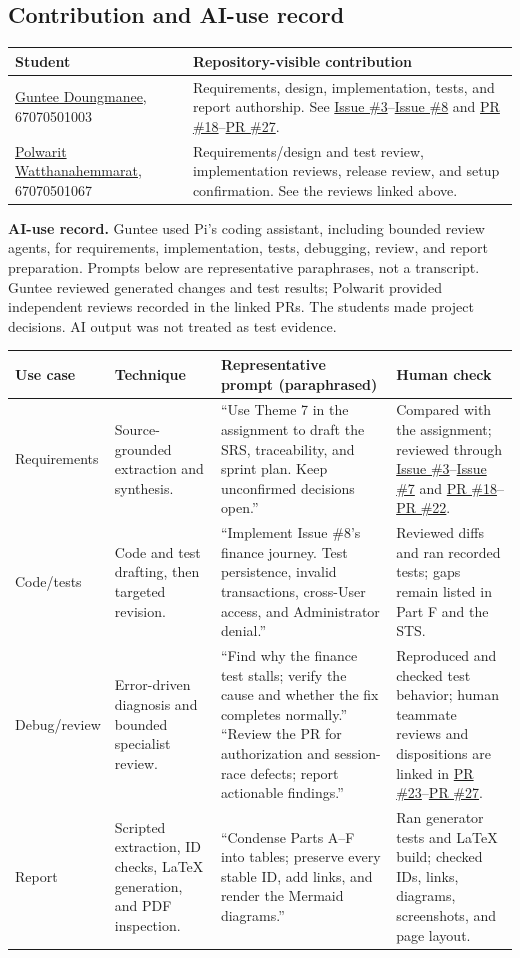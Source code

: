 \documentclass[10pt,a4paper]{article}
\renewcommand{\arraystretch}{1.08}
\newcommand{\IssueLink}[1]{\href{https://github.com/ovenmakemeheat/Pockit/issues/#1}{Issue \##1}}
\newcommand{\PRLink}[1]{\href{https://github.com/ovenmakemeheat/Pockit/pull/#1}{PR \##1}}
\newcommand{\UserLink}[2]{\href{https://github.com/#1}{#2}}
\begin{document}
\subsection{Contribution and AI-use record}
\begin{longtable}{@{}L{0.34\textwidth}L{0.63\textwidth}@{}}
\toprule
\textbf{Student} & \textbf{Repository-visible contribution} \\\midrule
\UserLink{ovenmakemeheat}{Guntee Doungmanee}, 67070501003 & Requirements, design, implementation, tests, and report authorship. See \IssueLink{3}–\IssueLink{8} and \PRLink{18}–\PRLink{27}. \\
\UserLink{MadMax168}{Polwarit Watthanahemmarat}, 67070501067 & Requirements/design and test review, implementation reviews, release review, and setup confirmation. See the reviews linked above. \\
\bottomrule
\end{longtable}
\noindent\textbf{AI-use record.} Guntee used Pi's coding assistant, including bounded review agents, for requirements, implementation, tests, debugging, review, and report preparation. Prompts below are representative paraphrases, not a transcript. Guntee reviewed generated changes and test results; Polwarit provided independent reviews recorded in the linked PRs. The students made project decisions. AI output was not treated as test evidence.\par\medskip
\footnotesize
\setlength{\tabcolsep}{3pt}
\renewcommand{\arraystretch}{1.08}
\begin{longtable}{@{}L{0.14\textwidth}L{0.18\textwidth}L{0.40\textwidth}L{0.22\textwidth}@{}}
\toprule
\textbf{Use case} & \textbf{Technique} & \textbf{Representative prompt (paraphrased)} & \textbf{Human check} \\\midrule
Requirements & Source-grounded extraction and synthesis. & ``Use Theme 7 in the assignment to draft the SRS, traceability, and sprint plan. Keep unconfirmed decisions open.'' & Compared with the assignment; reviewed through \IssueLink{3}--\IssueLink{7} and \PRLink{18}--\PRLink{22}. \\
Code/tests & Code and test drafting, then targeted revision. & ``Implement Issue \#8's finance journey. Test persistence, invalid transactions, cross-User access, and Administrator denial.'' & Reviewed diffs and ran recorded tests; gaps remain listed in Part F and the STS. \\
Debug/review & Error-driven diagnosis and bounded specialist review. & ``Find why the finance test stalls; verify the cause and whether the fix completes normally.'' \newline ``Review the PR for authorization and session-race defects; report actionable findings.'' & Reproduced and checked test behavior; human teammate reviews and dispositions are linked in \PRLink{23}--\PRLink{27}. \\
Report & Scripted extraction, ID checks, LaTeX generation, and PDF inspection. & ``Condense Parts A--F into tables; preserve every stable ID, add links, and render the Mermaid diagrams.'' & Ran generator tests and LaTeX build; checked IDs, links, diagrams, screenshots, and page layout. \\
\bottomrule
\end{longtable}
\end{document}
